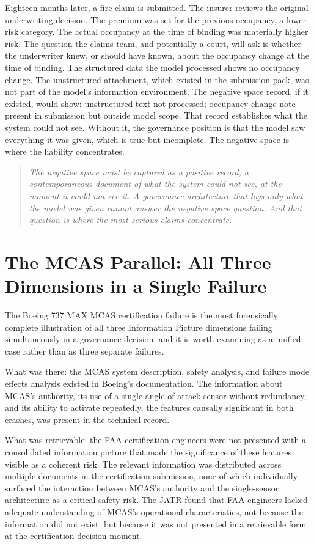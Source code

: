 Eighteen months later, a fire claim is submitted. The insurer reviews the original underwriting decision. The premium was set for the previous occupancy, a lower risk category. The actual occupancy at the time of binding was materially higher risk. The question the claims team, and potentially a court, will ask is whether the underwriter knew, or should have known, about the occupancy change at the time of binding. The structured data the model processed shows no occupancy change. The unstructured attachment, which existed in the submission pack, was not part of the model's information environment. The negative space record, if it existed, would show: unstructured text not processed; occupancy change note present in submission but outside model scope. That record establishes what the system could not see. Without it, the governance position is that the model saw everything it was given, which is true but incomplete. The negative space is where the liability concentrates.

\begin{quote}
\emph{The negative space must be captured as a positive record, a contemporaneous document of what the system could not see, at the moment it could not see it. A governance architecture that logs only what the model was given cannot answer the negative space question. And that question is where the most serious claims concentrate.}
\end{quote}

\scenebreak

\section{The MCAS Parallel: All Three Dimensions in a Single Failure}

The Boeing 737 MAX MCAS certification failure is the most forensically complete illustration of all three Information Picture dimensions failing simultaneously in a governance decision, and it is worth examining as a unified case rather than as three separate failures.

What was there: the MCAS system description, safety analysis, and failure mode effects analysis existed in Boeing's documentation. The information about MCAS's authority, its use of a single angle-of-attack sensor without redundancy, and its ability to activate repeatedly, the features causally significant in both crashes, was present in the technical record.

What was retrievable: the FAA certification engineers were not presented with a consolidated information picture that made the significance of these features visible as a coherent risk. The relevant information was distributed across multiple documents in the certification submission, none of which individually surfaced the interaction between MCAS's authority and the single-sensor architecture as a critical safety risk. The JATR found that FAA engineers lacked adequate understanding of MCAS's operational characteristics, not because the information did not exist, but because it was not presented in a retrievable form at the certification decision moment.

